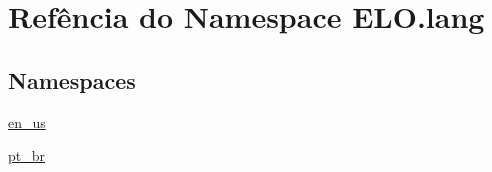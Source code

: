 \hypertarget{namespaceELO_1_1lang}{\section{Refência do Namespace E\-L\-O.\-lang}
\label{namespaceELO_1_1lang}
}
\subsection*{Namespaces}
\begin{DoxyCompactItemize}
\item 
\hyperlink{namespaceELO_1_1lang_1_1en__us}{en\-\_\-us}
\item 
\hyperlink{namespaceELO_1_1lang_1_1pt__br}{pt\-\_\-br}
\end{DoxyCompactItemize}
